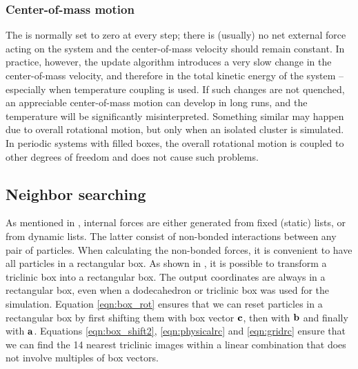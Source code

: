 \subsubsection{Center-of-mass motion}
The  is normally set to zero at
every step; there is (usually) no net external force acting on the
system and the center-of-mass velocity should remain constant. In
practice, however, the update algorithm introduces a very slow change in
the center-of-mass velocity, and therefore in the total kinetic energy of
the system -- especially when temperature coupling is used. If such
changes are not quenched, an appreciable center-of-mass motion
can develop in long runs, and the temperature will be
significantly misinterpreted. Something similar may happen due to overall
rotational motion, but only when an isolated cluster is simulated. In
periodic systems with filled boxes, the overall rotational motion is
coupled to other degrees of freedom and does not cause such problems.


\subsection{Neighbor searching}
\label{subsec:ns}
As mentioned in , internal forces are
either generated from fixed (static) lists, or from dynamic lists.
The latter consist of non-bonded interactions between any pair of particles.
When calculating the non-bonded forces, it is convenient to have all
particles in a rectangular box.
As shown in , it is possible to transform a
triclinic box into a rectangular box.
The output coordinates are always in a rectangular box, even when a
dodecahedron or triclinic box was used for the simulation.
Equation \ref{eqn:box_rot} ensures that we can reset particles
in a rectangular box by first shifting them with
box vector ${\bf c}$, then with ${\bf b}$ and finally with ${\bf a}$.
Equations \ref{eqn:box_shift2}, \ref{eqn:physicalrc} and \ref{eqn:gridrc}
ensure that we can find the 14 nearest triclinic images within
a linear combination that does not involve multiples of box vectors.


